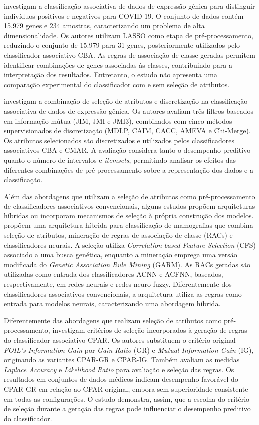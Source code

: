  investigam a classificação associativa de dados de expressão gênica para distinguir indivíduos positivos e negativos para COVID-19. O conjunto de dados contém 15.979 genes e 234 amostras, caracterizando um problema de alta dimensionalidade. Os autores utilizam LASSO como etapa de pré-processamento, reduzindo o conjunto de 15.979 para 31 genes, posteriormente utilizados pelo classificador associativo CBA. As regras de associação de classe geradas permitem identificar combinações de genes associadas às classes, contribuindo para a interpretação dos resultados. Entretanto, o estudo não apresenta uma comparação experimental do classificador com e sem seleção de atributos.

 investigam a combinação de seleção de atributos e discretização na classificação associativa de dados de expressão gênica. Os autores avaliam três filtros baseados em informação mútua (JIM, JMI e JMI3), combinados com cinco métodos supervisionados de discretização (MDLP, CAIM, CACC, AMEVA e Chi-Merge). Os atributos selecionados são discretizados e utilizados pelos classificadores associativos CBA e CMAR. A avaliação considera tanto o desempenho preditivo quanto o número de intervalos e \textit{itemsets}, permitindo analisar os efeitos das diferentes combinações de pré-processamento sobre a representação dos dados e a classificação.

Além das abordagens que utilizam a seleção de atributos como pré-processamento de classificadores associativos convencionais, alguns estudos propõem arquiteturas híbridas ou incorporam mecanismos de seleção à própria construção dos modelos.  propõem uma arquitetura híbrida para classificação de mamografias que combina seleção de atributos, mineração de regras de associação de classe (RACs) e classificadores neurais. A seleção utiliza \textit{Correlation-based Feature Selection} (CFS) associado a uma busca genética, enquanto a mineração emprega uma versão modificada do \textit{Genetic Association Rule Mining} (GARM). As RACs geradas são utilizadas como entrada dos classificadores ACNN e ACFNN, baseados, respectivamente, em redes neurais e redes neuro-fuzzy. Diferentemente dos classificadores associativos convencionais, a arquitetura utiliza as regras como entrada para modelos neurais, caracterizando uma abordagem híbrida.

Diferentemente das abordagens que realizam seleção de atributos como pré-processamento,  investigam critérios de seleção incorporados à geração de regras do classificador associativo CPAR. Os autores substituem o critério original \textit{FOIL's Information Gain} por \textit{Gain Ratio} (GR) e \textit{Mutual Information Gain} (IG), originando as variantes CPAR-GR e CPAR-IG. Também avaliam as medidas \textit{Laplace Accuracy} e \textit{Likelihood Ratio} para avaliação e seleção das regras. Os resultados em conjuntos de dados médicos indicam desempenho favorável do CPAR-GR em relação ao CPAR original, embora sem superioridade consistente em todas as configurações. O estudo demonstra, assim, que a escolha do critério de seleção durante a geração das regras pode influenciar o desempenho preditivo do classificador.

